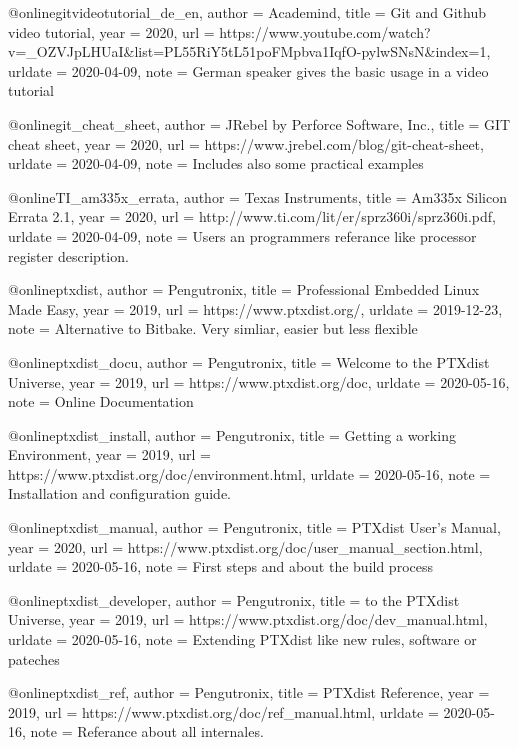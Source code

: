@online{gitvideotutorial_de_en,
author = {Academind},
title = {Git and Github video tutorial},
year = 2020,
url = {https://www.youtube.com/watch?v=_OZVJpLHUaI&list=PL55RiY5tL51poFMpbva1IqfO-pylwSNsN&index=1},
urldate = {2020-04-09},
note = {German speaker gives the basic usage in a video tutorial}
}


@online{git_cheat_sheet,
author = {JRebel by Perforce Software, Inc.},
title = {GIT cheat sheet},
year = 2020,
url = {https://www.jrebel.com/blog/git-cheat-sheet},
urldate = {2020-04-09},
note = {Includes also some practical examples}
}


@online{TI_am335x_errata,
author = {Texas Instruments},
title = {Am335x Silicon Errata 2.1},
year = 2020,
url = {http://www.ti.com/lit/er/sprz360i/sprz360i.pdf},
urldate = {2020-04-09},
note = {Users an programmers referance like processor register description.}
}

@online{ptxdist,
    author = {Pengutronix},
    title = {Professional Embedded Linux Made Easy},
    year = 2019,
    url = {https://www.ptxdist.org/},
    urldate = {2019-12-23},
    note = { Alternative to Bitbake. Very simliar, easier but less flexible}
}

@online{ptxdist_docu,
    author = {Pengutronix},
    title = {Welcome to the PTXdist Universe},
    year = 2019,
    url = {https://www.ptxdist.org/doc},
    urldate = {2020-05-16},
    note = {Online Documentation}
}

@online{ptxdist_install,
    author = {Pengutronix},
    title = {Getting a working Environment},
    year = 2019,
    url = {https://www.ptxdist.org/doc/environment.html},
    urldate = {2020-05-16},
    note = {Installation and configuration guide.}
}

@online{ptxdist_manual,
    author = {Pengutronix},
    title = {PTXdist User's Manual},
    year = 2020,
    url = {https://www.ptxdist.org/doc/user_manual_section.html},
    urldate = {2020-05-16},
    note = {First steps and about the build process}
}

@online{ptxdist_developer,
    author = {Pengutronix},
    title = {to the PTXdist Universe},
    year = 2019,
    url = {https://www.ptxdist.org/doc/dev_manual.html},
    urldate = {2020-05-16},
    note = {Extending PTXdist like new rules, software or pateches }
}

@online{ptxdist_ref,
    author = {Pengutronix},
    title = {PTXdist Reference},
    year = 2019,
    url = {https://www.ptxdist.org/doc/ref_manual.html},
    urldate = {2020-05-16},
    note = {Referance about all internales.}
}

